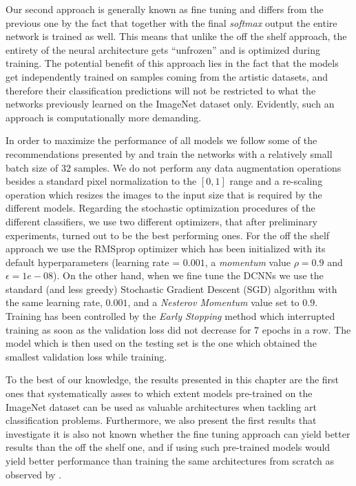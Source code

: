 Our second approach is generally known as fine tuning and differs from the previous one by the fact that together with the final \textit{softmax} output the entire network is trained as well. This means that unlike the off the shelf approach, the entirety of the neural architecture gets ``unfrozen'' and is optimized during training. The potential benefit of this approach lies in the fact that the models get independently trained on samples coming from the artistic datasets, and therefore their classification predictions will not be restricted to what the networks previously learned on the ImageNet dataset only. Evidently, such an approach is computationally more demanding.

In order to maximize the performance of all models we follow some of the recommendations presented by \citet{masters2018revisiting} and train the networks with a relatively small batch size of $32$ samples. We do not perform any data augmentation operations besides a standard pixel normalization to the $[0, 1]$ range and a re-scaling operation which resizes the images to the input size that is required by the different models. Regarding the stochastic optimization procedures of the different classifiers, we use two different optimizers, that after preliminary experiments, turned out to be the best performing ones. For the off the shelf approach we use the RMSprop optimizer \cite{tieleman2012lecture} which has been initialized with its default hyperparameters (learning rate = $0.001$, a \textit{momentum} value $\rho = 0.9$ and $\epsilon =1e-08$). On the other hand, when we fine tune the DCNNs we use the standard (and less greedy) Stochastic Gradient Descent (SGD) algorithm with the same learning rate, $0.001$, and a \textit{Nesterov Momentum} value set to $0.9$.
Training has been controlled by the \textit{Early Stopping} method \cite{caruana2001overfitting} which interrupted training as soon as the validation loss did not decrease for $7$ epochs in a row. The model which is then used on the testing set is the one which obtained the smallest validation loss while training.

To the best of our knowledge, the results presented in this chapter are the first ones that systematically asses to which extent models pre-trained on the ImageNet dataset can be used as valuable architectures when tackling art classification problems. Furthermore, we also present the first results that investigate it is also not known whether the fine tuning approach can yield better results than the off the shelf one, and if using such pre-trained models would yield better performance than training the same architectures from scratch as observed by \citet{kornblith2018better}.

